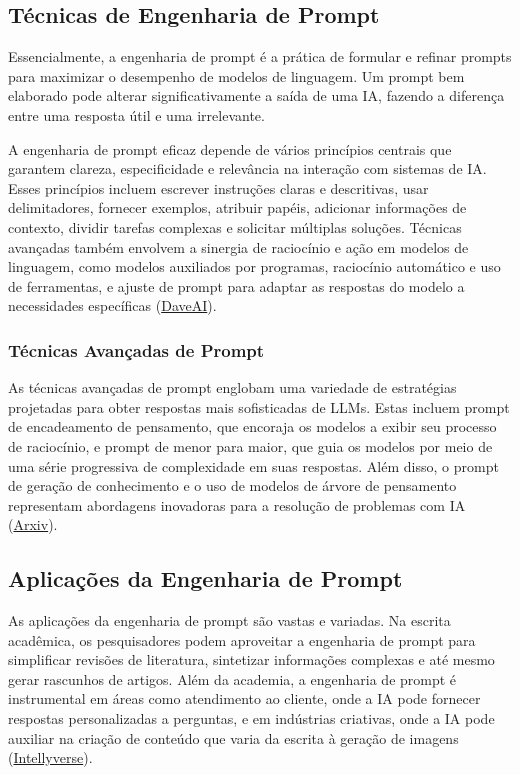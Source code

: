 \documentclass[tcc,capa]{texufpel}
\begin{document}
\subsection*{Técnicas de Engenharia de Prompt}
Essencialmente, a engenharia de prompt é a prática de formular e refinar prompts para maximizar o desempenho de modelos de linguagem. Um prompt bem elaborado pode alterar significativamente a saída de uma IA, fazendo a diferença entre uma resposta útil e uma irrelevante.

A engenharia de prompt eficaz depende de vários princípios centrais que garantem clareza, especificidade e relevância na interação com sistemas de IA. Esses princípios incluem escrever instruções claras e descritivas, usar delimitadores, fornecer exemplos, atribuir papéis, adicionar informações de contexto, dividir tarefas complexas e solicitar múltiplas soluções. Técnicas avançadas também envolvem a sinergia de raciocínio e ação em modelos de linguagem, como modelos auxiliados por programas, raciocínio automático e uso de ferramentas, e ajuste de prompt para adaptar as respostas do modelo a necessidades específicas (\href{https://daveai.substack.com/p/prompt-engineering-full-guide}{DaveAI}).

\subsubsection*{Técnicas Avançadas de Prompt}

As técnicas avançadas de prompt englobam uma variedade de estratégias projetadas para obter respostas mais sofisticadas de LLMs. Estas incluem prompt de encadeamento de pensamento, que encoraja os modelos a exibir seu processo de raciocínio, e prompt de menor para maior, que guia os modelos por meio de uma série progressiva de complexidade em suas respostas. Além disso, o prompt de geração de conhecimento e o uso de modelos de árvore de pensamento representam abordagens inovadoras para a resolução de problemas com IA (\href{https://arxiv.org/abs/2210.03629}{Arxiv}).

\subsection*{Aplicações da Engenharia de Prompt}

As aplicações da engenharia de prompt são vastas e variadas. Na escrita acadêmica, os pesquisadores podem aproveitar a engenharia de prompt para simplificar revisões de literatura, sintetizar informações complexas e até mesmo gerar rascunhos de artigos. Além da academia, a engenharia de prompt é instrumental em áreas como atendimento ao cliente, onde a IA pode fornecer respostas personalizadas a perguntas, e em indústrias criativas, onde a IA pode auxiliar na criação de conteúdo que varia da escrita à geração de imagens (\href{https://intellyverse.com/blog/prompt-engineering}{Intellyverse}).
\end{document}
